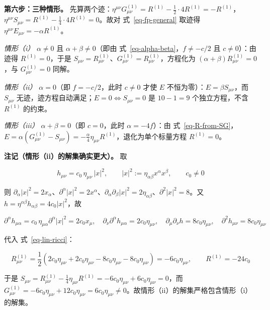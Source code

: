 \documentclass[
  chinese,
  a4paper,
  UTF8,
  12pt,
  oneside,
  openany]{ctexbook}
\theoremstyle{plain}
\theoremstyle{plain}
\theoremstyle{plain}
\theoremstyle{definition}
\theoremstyle{plain}
\theoremstyle{plain}
\theoremstyle{remark}
\begin{document}
\textbf{第六步：三种情形。}
先算两个迹：\(\eta^{\mu\nu}G^{(1)}_{\mu\nu}=R^{(1)}-\frac{1}{2}\cdot4R^{(1)}=-R^{(1)}\)，\(\eta^{\mu\nu}S_{\mu\nu}=R^{(1)}-\frac{1}{4}\cdot4R^{(1)}=0\)。故对
式~\ref{eq-fp-general} 取迹得
\(\eta^{\mu\nu}E_{\mu\nu}=-\alpha R^{(1)}\)。

\emph{情形（i）} \(\alpha\neq0\) 且 \(\alpha+\beta\neq0\)（即由
式~\ref{eq-alpha-beta}，\(f\neq-c/2\) 且 \(c\neq0\)）：由迹得
\(R^{(1)}=0\)，于是
\(S_{\mu\nu}=R^{(1)}_{\mu\nu}\)、\(G^{(1)}_{\mu\nu}=R^{(1)}_{\mu\nu}\)，方程化为
\((\alpha+\beta)R^{(1)}_{\mu\nu}=0\)，与 \(G^{(1)}_{\mu\nu}=0\) 同解。

\emph{情形（ii）} \(\alpha=0\)（即 \(f=-c/2\)，此时 \(c\neq0\) 才使
\(E\) 不恒为零）：\(E=\beta S_{\mu\nu}\)，而 \(S_{\mu\nu}\)
无迹，迹方程自动满足；\(E=0\iff S_{\mu\nu}=0\) 是 \(10-1=9\)
个独立方程，不含 \(R^{(1)}\) 的约束。

\emph{情形（iii）} \(\alpha+\beta=0\)（即 \(c=0\)，此时
\(\alpha=-4f\)）：由
式~\ref{eq-R-from-SG}，\(E=\alpha\left(G^{(1)}_{\mu\nu}-S_{\mu\nu}\right)=-\frac{\alpha}{4}\eta_{\mu\nu}R^{(1)}\)，退化为单个标量方程
\(R^{(1)}=0\)。

\textbf{注记（情形（ii）的解集确实更大）。} 取

\[
h_{\mu\nu}=c_{0}\,\eta_{\mu\nu}\,|x|^{2},
\qquad
|x|^{2}:=\eta_{\alpha\beta}x^{\alpha}x^{\beta},
\qquad
c_{0}\neq0
\]

则
\(\partial_{\alpha}|x|^{2}=2x_{\alpha}\)、\(\partial^{\alpha}|x|^{2}=2x^{\alpha}\)、\(\partial_{\alpha}\partial_{\beta}|x|^{2}=2\eta_{\alpha\beta}\)、\(\partial^{2}|x|^{2}=8\)。又
\(h=\eta^{\alpha\beta}h_{\alpha\beta}=4c_{0}|x|^{2}\)，故

\[
\partial^{\alpha}h_{\mu\alpha}=c_{0}\,\eta_{\mu\alpha}\partial^{\alpha}|x|^{2}=2c_{0}x_{\mu},
\quad
\partial_{\nu}\partial^{\alpha}h_{\mu\alpha}=2c_{0}\eta_{\mu\nu},
\quad
\partial_{\mu}\partial_{\nu}h=8c_{0}\eta_{\mu\nu},
\quad
\partial^{2}h_{\mu\nu}=8c_{0}\eta_{\mu\nu}
\]

代入 式~\ref{eq-lin-ricci}：

\[
R^{(1)}_{\mu\nu}
=\frac{1}{2}\left(2c_{0}\eta_{\mu\nu}+2c_{0}\eta_{\mu\nu}-8c_{0}\eta_{\mu\nu}-8c_{0}\eta_{\mu\nu}\right)
=-6c_{0}\eta_{\mu\nu},
\qquad
R^{(1)}=-24c_{0}
\]

于是
\(S_{\mu\nu}=R^{(1)}_{\mu\nu}-\frac{1}{4}\eta_{\mu\nu}R^{(1)}=-6c_{0}\eta_{\mu\nu}+6c_{0}\eta_{\mu\nu}=0\)，而
\(G^{(1)}_{\mu\nu}=-6c_{0}\eta_{\mu\nu}+12c_{0}\eta_{\mu\nu}=6c_{0}\eta_{\mu\nu}\neq0\)。故情形（ii）的解集严格包含情形（i）的解集。
\end{document}
